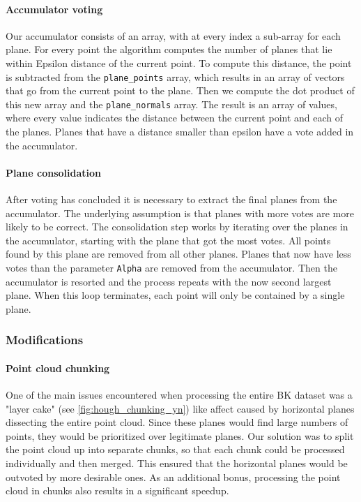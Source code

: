 \documentclass[a4paper,9pt]{article}
\begin{document}
\paragraph{Accumulator voting}

Our accumulator consists of an array, with at every index a sub-array for each plane. For every point the algorithm computes the number of planes that lie within Epsilon distance of the current point. To compute this distance, the point is subtracted from the \verb|plane_points| array, which results in an array of vectors that go from the current point to the plane. Then we compute the dot product of this new array and the \verb|plane_normals| array. The result is an array of values, where every value indicates the distance between the current point and each of the planes. Planes that have a distance smaller than epsilon have a vote added in the accumulator.

\paragraph{Plane consolidation}

After voting has concluded it is necessary to extract the final planes from the accumulator. The underlying assumption is that planes with more votes are more likely to be correct. The consolidation step works by iterating over the planes in the accumulator, starting with the plane that got the most votes. All points found by this plane are removed from all other planes. Planes that now have less votes than the parameter \verb|Alpha| are removed from the accumulator. Then the accumulator is resorted and the process repeats with the now second largest plane. When this loop terminates, each point will only be contained by a single plane.

\subsubsection{Modifications}

\paragraph{Point cloud chunking}

One of the main issues encountered when processing the entire BK dataset was a "layer cake" (see \ref{fig:hough_chunking_yn}) like affect caused by horizontal planes dissecting the entire point cloud. Since these planes would find large numbers of points, they would be prioritized over legitimate planes. Our solution was to split the point cloud up into separate chunks, so that each chunk could be processed individually and then merged. This ensured that the horizontal planes would be outvoted by more desirable ones. As an additional bonus, processing the point cloud in chunks also results in a significant speedup.
\end{document}
